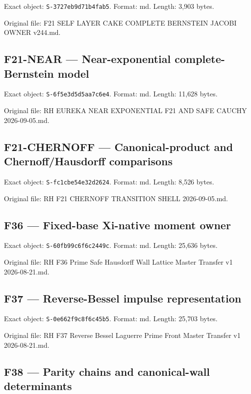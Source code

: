 \documentclass[
  10pt,
  a4paper,
  10pt,
  oneside,
  openany]{book}
\begin{document}
Exact object: \texttt{S-3727eb9d71b4fab5}. Format: md. Length: 3,903
bytes.

Original file: F21 SELF LAYER CAKE COMPLETE BERNSTEIN JACOBI OWNER
v244.md.

\subsection{F21-NEAR --- Near-exponential complete-Bernstein
model}\label{source-f21-near}

Exact object: \texttt{S-6f5e3d5d5aa7c6e4}. Format: md. Length: 11,628
bytes.

Original file: RH EUREKA NEAR EXPONENTIAL F21 AND SAFE CAUCHY
2026-09-05.md.

\subsection{F21-CHERNOFF --- Canonical-product and Chernoff/Hausdorff
comparisons}\label{source-f21-chernoff}

Exact object: \texttt{S-fc1cbe54e32d2624}. Format: md. Length: 8,526
bytes.

Original file: RH F21 CHERNOFF TRANSITION SHELL 2026-09-05.md.

\subsection{F36 --- Fixed-base Xi-native moment owner}\label{source-f36}

Exact object: \texttt{S-60fb99c6f6c2449c}. Format: md. Length: 25,636
bytes.

Original file: RH F36 Prime Safe Hausdorff Wall Lattice Master Transfer
v1 2026-08-21.md.

\subsection{F37 --- Reverse-Bessel impulse
representation}\label{source-f37}

Exact object: \texttt{S-0e662f9c8f6c45b5}. Format: md. Length: 25,703
bytes.

Original file: RH F37 Reverse Bessel Laguerre Prime Front Master
Transfer v1 2026-08-21.md.

\subsection{F38 --- Parity chains and canonical-wall
determinants}\label{source-f38}
\end{document}
